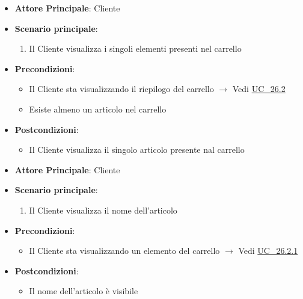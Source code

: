 \label{uc_26.2.1}

\begin{itemize}
    \item \textbf{Attore Principale}: Cliente
	\item \textbf{Scenario principale}: 
	\begin{enumerate}
		\item Il Cliente visualizza i singoli elementi presenti nel carrello
	\end{enumerate}
	\item \textbf{Precondizioni}: 
	\begin{itemize}
		\item Il Cliente sta visualizzando il riepilogo del carrello $\rightarrow$ Vedi \hyperref[uc_26.2]{UC\_26.2}
		\item Esiste almeno un articolo nel carrello
	\end{itemize}
	\item \textbf{Postcondizioni}:
	\begin{itemize}
		\item Il Cliente visualizza il singolo articolo presente nal carrello
	\end{itemize}
\end{itemize}

\label{uc_26.2.1.1}
\begin{itemize}
    \item \textbf{Attore Principale}: Cliente
	\item \textbf{Scenario principale}: 
	\begin{enumerate}
		\item Il Cliente visualizza il nome dell'articolo
	\end{enumerate}
	\item \textbf{Precondizioni}: 
	\begin{itemize}
		\item Il Cliente sta visualizzando un elemento del carrello $\rightarrow$ Vedi \hyperref[uc_26.2.1]{UC\_26.2.1}
	\end{itemize}
	\item \textbf{Postcondizioni}:
	\begin{itemize}
		\item Il nome dell'articolo è visibile
	\end{itemize} 
\end{itemize}


